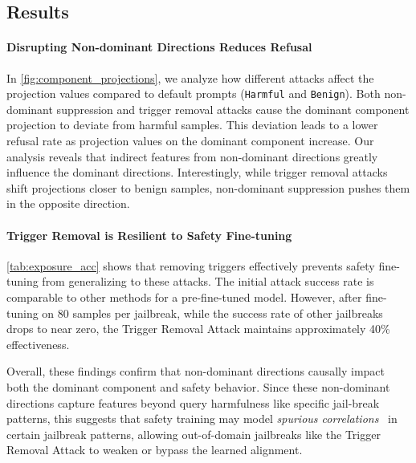 \subsection{Results}
\paragraph{Disrupting Non-dominant Directions Reduces Refusal}
In \autoref{fig:component_projections}, we analyze how different attacks affect the projection values compared to default prompts (\texttt{Harmful} and \texttt{Benign}). Both non-dominant suppression and trigger removal attacks cause the dominant component projection to deviate from harmful samples. This deviation leads to a lower refusal rate as projection values on the dominant component increase. Our analysis reveals that indirect features from non-dominant directions greatly influence the dominant directions. Interestingly, while trigger removal attacks shift projections closer to benign samples, non-dominant suppression pushes them in the opposite direction.

\paragraph{Trigger Removal is Resilient to Safety Fine-tuning}

\autoref{tab:exposure_acc} shows that removing triggers effectively prevents safety fine-tuning from generalizing to these attacks. The initial attack success rate is comparable to other methods for a pre-fine-tuned model. However, after fine-tuning on 80 samples per jailbreak, while the success rate of other jailbreaks drops to near zero, the Trigger Removal Attack maintains approximately 40\% effectiveness.


Overall, these findings confirm that non-dominant directions causally impact both the dominant component and safety behavior. Since these non-dominant directions capture features beyond query harmfulness like specific jail-break patterns, this suggests that safety training may model \emph{spurious correlations}~\cite{geirhos2020shortcut} in certain jailbreak patterns, allowing out-of-domain jailbreaks like the Trigger Removal Attack to weaken or bypass the learned alignment.

